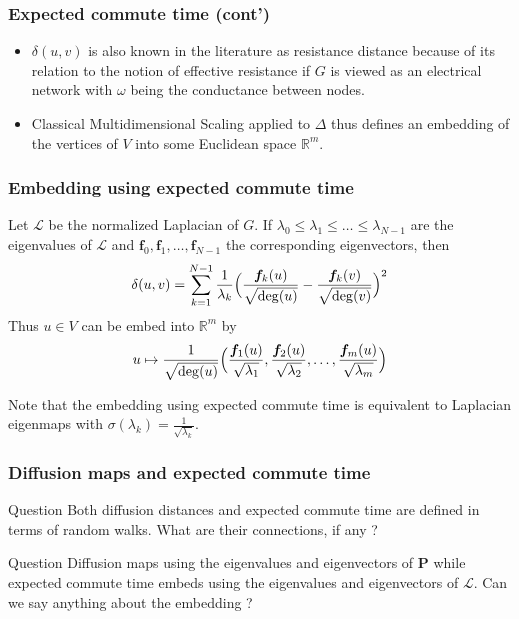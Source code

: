 \documentclass[professionalfonts, hyperref={pdfpagelabels=false,
  colorlinks=true, linkcolor=purple}]{beamer}
\begin{document}
\begin{frame}
  \frametitle{Expected commute time (cont')}
  \begin{itemize}
  \item $\delta(u,v)$ is also known in
    the literature as \alert{resistance distance}
    \cite{klein93:_resis_distan} because of its relation to the notion
    of effective resistance if $G$ is viewed as an electrical network
    with $\omega$ being the conductance between nodes.
  \item Classical Multidimensional Scaling applied to $\Delta$
    thus defines an embedding of the vertices of $V$ into some
    Euclidean space $\mathbb{R}^{m}$.
  \end{itemize}
\end{frame}
\begin{frame}
  \frametitle{Embedding using expected commute time}
  \begin{fact}
    \label{prop:1}
    Let $\bm{\mathcal{L}}$ be the normalized Laplacian of $G$. If
    $\lambda_0 \leq \lambda_1 \leq \dots \leq \lambda_{N-1}$ are the
    eigenvalues of $\mathcal{L}$ and $\bm{f}_0, \bm{f}_1, \dots,
    \bm{f}_{N-1}$ the corresponding eigenvectors, then
    \begin{equation}
      \label{eq:13}
      \delta(u,v) = \sum_{k =
        1}^{N-1}{\frac{1}{\lambda_k}\Bigl(\frac{\bm{f}_k(u)}{\sqrt{\deg(u)}}
        - \frac{\bm{f}_k(v)}{\sqrt{\deg(v)}}\Bigr)^2} 
    \end{equation}
    Thus $u \in V$ can be embed into $\mathbb{R}^{m}$ by
    \begin{equation}
      \label{eq:14}
      u \mapsto \frac{1}{\sqrt{\deg(u)}}\Bigl(
      \frac{\bm{f}_{1}(u)}{\sqrt{\lambda_1}},
      \frac{\bm{f}_{2}(u)}{\sqrt{\lambda_2}}, \dots,
      \frac{\bm{f}_{m}(u)}{\sqrt{\lambda_m}}\Bigr)
    \end{equation}
  \end{fact}
    Note that the embedding using expected commute time is equivalent
    to Laplacian eigenmaps with $\sigma(\lambda_k) =
    \tfrac{1}{\sqrt{\lambda_k}}$. 
\end{frame}

\begin{frame}
  \frametitle{Diffusion maps and expected commute time}
    \begin{alertblock}{Question}
      Both diffusion distances and expected commute time are
      defined in terms of random walks. What are their connections, if
      any ?
    \end{alertblock}
    \begin{alertblock}{Question}
      Diffusion maps
      \hyperlink{diffusion_maps<5>}{} using the
      eigenvalues and eigenvectors of $\bm{P}$ while expected commute
      time embeds using the eigenvalues and eigenvectors of
      $\mathcal{L}$. Can we say anything about the embedding ?
    \end{alertblock}
\end{frame}
\end{document}
